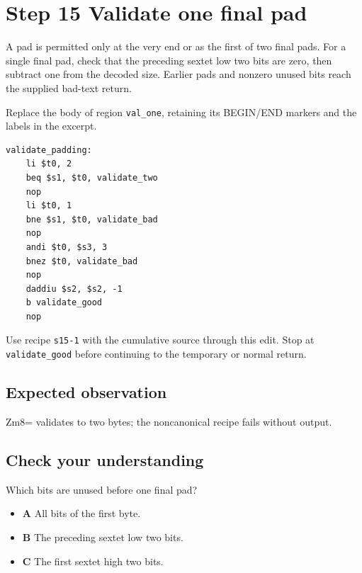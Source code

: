 \section{Step 15 Validate one final pad}\label{base64-s15}

A pad is permitted only at the very end or as the first of two final pads. For a single final pad, check that the preceding sextet low two bits are zero, then subtract one from the decoded size. Earlier pads and nonzero unused bits reach the supplied bad-text return.

Replace the body of region \texttt{val\_one}, retaining its BEGIN/END markers and the labels in the excerpt.

\begin{verbatim}
validate_padding:
    li $t0, 2
    beq $s1, $t0, validate_two
    nop
    li $t0, 1
    bne $s1, $t0, validate_bad
    nop
    andi $t0, $s3, 3
    bnez $t0, validate_bad
    nop
    daddiu $s2, $s2, -1
    b validate_good
    nop
\end{verbatim}

Use recipe \texttt{s15-1} with the cumulative source through this edit. Stop at \texttt{validate\_good} before continuing to the temporary or normal return.

\subsection{Expected observation}
Zm8= validates to two bytes; the noncanonical recipe fails without output.

\subsection{Check your understanding}
Which bits are unused before one final pad?

\begin{itemize}
\item \textbf{A} All bits of the first byte.
\item \textbf{B} The preceding sextet low two bits.
\item \textbf{C} The first sextet high two bits.
\end{itemize}
